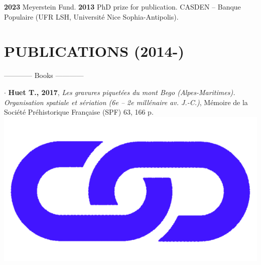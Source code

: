 \documentclass{article}
\begin{document}
\textbf{2023 }Meyerstein Fund.
\smallbreak
\textbf{2013 }PhD prize for publication. CASDEN -- Banque Populaire (UFR LSH, Universit\'{e} Nice Sophia-Antipolis).
\smallbreak

\section{PUBLICATIONS (2014-)}

\begin{center}------------ Books ------------ \end{center}
\smallbreak
$\cdot$ \textbf{Huet T., 2017}, \textit{Les gravures piquet\'{e}es du mont Bego (Alpes-Maritimes). Organisation spatiale et s\'{e}riation (6e -- 2e mill\'{e}naire av. J.-C.)}, M\'{e}moire de la Soci\'{e}t\'{e} Pr\'{e}historique Fran\c{c}aise (SPF) 63, 166 p. \href{http://www.prehistoire.org/shop_515-40342-0-0/m63-2017-les-gravures-piquetees-du-mont-bego-alpes-maritimes-organisation-spatiale-et-seriation-vie-iie-millenaire-av.-j.-c.-t.-huet.html}{\includegraphics[scale=0.02]{link_darkblue.png}}
\end{document}
